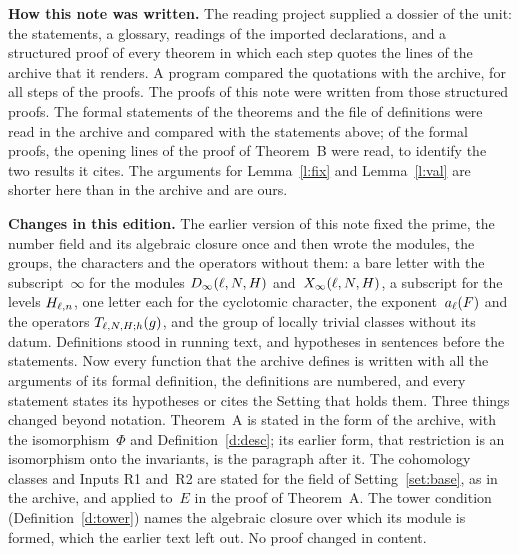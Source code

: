 \documentclass[11pt,a4paper]{article}
\newcommand{\subhead}[1]{\par\addvspace{9pt plus 2pt}\Needspace{4\baselineskip}\noindent\textbf{#1}\enspace\ignorespaces}
\theoremstyle{plainx}
\theoremstyle{uprightx}
\begin{document}
\subhead{How this note was written.} The reading project supplied a dossier of the unit: the statements, a
glossary, readings of the imported declarations, and a structured proof of every theorem in which each step
quotes the lines of the archive that it renders. A program compared the quotations with the archive, for all
\UnitSteps{} steps of the \UnitProofs{} proofs. The proofs of this note were written from those structured proofs.
The formal statements of the theorems and the file of definitions were read in the archive and compared with the
statements above; of the formal proofs, the opening lines of the proof of Theorem~B were read, to identify the two
results it cites. The arguments for Lemma~\ref{l:fix} and Lemma~\ref{l:val} are shorter here than in the
archive and are ours.

\subhead{Changes in this edition.} The earlier version of this note fixed the prime, the number field and its
algebraic closure once and then wrote the modules, the groups, the characters and the operators without them: a
bare letter with the subscript~$\infty$ for the modules $D_\infty(\ell,N,H)$ and~$X_\infty(\ell,N,H)$, a subscript for
the levels $H_{\ell,n}$, one letter each for the cyclotomic character, the exponent~$a_{\ell}(F)$ and the
operators $T_{\ell,N,H;h}(g)$, and the group of locally trivial classes without its datum. Definitions stood
in running text, and hypotheses in sentences before the statements. Now every function that the archive defines
is written with all the arguments of its formal definition, the definitions are numbered, and every statement
states its hypotheses or cites the Setting that holds them. Three things changed beyond notation. Theorem~A is
stated in the form of the archive, with the isomorphism~$\Phi$ and Definition~\ref{d:desc}; its earlier form,
that restriction is an isomorphism onto the invariants, is the paragraph after it. The cohomology classes and
Inputs R1 and~R2 are stated for the field of Setting~\ref{set:base}, as in the archive, and applied to~$E$ in the
proof of Theorem~A. The tower condition (Definition~\ref{d:tower}) names the algebraic closure over which its
module is formed, which the earlier text left out. No proof changed in content.
\end{document}
